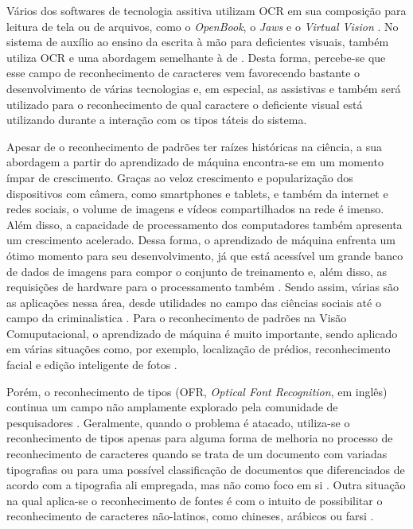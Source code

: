 Vários dos softwares de tecnologia assitiva utilizam OCR em sua composição para leitura de tela ou de arquivos, como o \textit{OpenBook}, o \textit{Jaws} e o \textit{Virtual Vision}   . No sistema de auxílio ao ensino da escrita à mão para deficientes visuais,  também utiliza OCR e uma abordagem semelhante à de . Desta forma, percebe-se que esse campo de reconhecimento de caracteres vem favorecendo bastante o desenvolvimento de várias tecnologias e, em especial, as assistivas e também será utilizado para o reconhecimento de qual caractere o deficiente visual está utilizando durante a interação com os tipos táteis do sistema.

Apesar de o reconhecimento de padrões ter raízes históricas na ciência, a sua abordagem a partir do aprendizado de máquina encontra-se em um momento ímpar de crescimento. Graças ao veloz crescimento e popularização dos dispositivos com câmera, como smartphones e tablets, e também da internet e redes sociais, o volume de imagens e vídeos compartilhados na rede é imenso. Além disso, a capacidade de processamento dos computadores também apresenta um crescimento acelerado. Dessa forma, o aprendizado de máquina enfrenta um ótimo momento  para seu desenvolvimento, já que está acessível um grande banco de dados de imagens para compor o conjunto de treinamento e, além disso, as requisições de hardware para o processamento também . Sendo assim, várias são as aplicações nessa área, desde utilidades no campo das ciências sociais até o campo da criminalistica  . Para o reconhecimento de padrões na Visão Comuputacional, o aprendizado de máquina é muito importante, sendo aplicado em várias situações como, por exemplo, localização de prédios, reconhecimento facial e edição inteligente de fotos .

Porém, o reconhecimento de tipos (OFR, \textit{Optical Font Recognition}, em inglês) continua um campo não amplamente explorado pela comunidade de pesquisadores . Geralmente, quando o problema é atacado, utiliza-se o reconhecimento de tipos apenas para alguma forma de melhoria no processo de reconhecimento de caracteres quando se trata de um documento com variadas tipografias ou para uma possível classificação de documentos que diferenciados de acordo com a tipografia ali empregada, mas não como foco em si  . Outra situação na qual aplica-se o reconhecimento de fontes é com o intuito de possibilitar o reconhecimento de caracteres não-latinos, como chineses, arábicos ou farsi   .

